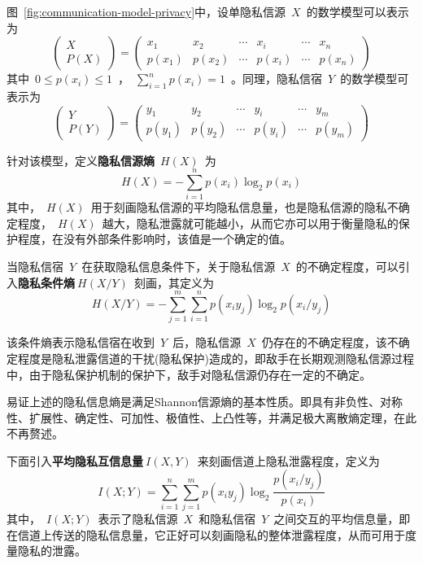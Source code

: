 图~\ref{fig:communication-model-privacy}中，设单隐私信源~$X$~的数学模型可以表示为
\begin{equation}
\begin{pmatrix}
X\\ 
P(X)
\end{pmatrix}=\begin{pmatrix}
x_{1} & x_{2} & \cdots  & x_{i} & \cdots  & x_{n}\\ 
p(x_{1})& p(x_{2}) & \cdots & p(x_{i}) & \cdots & p(x_{n})
\end{pmatrix}
\end{equation}
其中~$0\leqslant p(x_{i})\leqslant1$~，~$\sum_{i=1}^{n}p(x_{i})=1$~。同理，隐私信宿~$Y$~的数学模型可表示为
\begin{equation}
\label{eq:single-information-source}
\begin{pmatrix}
Y\\ 
P(Y)
\end{pmatrix}=\begin{pmatrix}
y_{1} & y_{2} & \cdots  & y_{i} & \cdots  & y_{m}\\ 
p(y_{1})& p(y_{2}) & \cdots & p(y_{i}) & \cdots & p(y_{m})
\end{pmatrix}
\end{equation}

针对该模型，定义\textbf{隐私信源熵}~$H(X)$~为
\begin{equation}
H(X)=-\sum_{i=1}^{n}p(x_{i})\log_{2}p(x_{i})
\end{equation}
其中，~$H(X)$~用于刻画隐私信源的平均隐私信息量，也是隐私信源的隐私不确定程度，~$H(X)$~越大，隐私泄露就可能越小，从而它亦可以用于衡量隐私的保护程度，在没有外部条件影响时，该值是一个确定的值。

当隐私信宿~$Y$~在获取隐私信息条件下，关于隐私信源~$X$~的不确定程度，可以引入\textbf{隐私条件熵}$~H(X/Y)$~刻画，其定义为
\begin{equation}
H(X/Y)=-\sum_{j=1}^{m}\sum_{i=1}^{n}p(x_{i}y_{j})\log_{2}p(x_{i}/y_{j})
\end{equation}

该条件熵表示隐私信宿在收到~$Y$~后，隐私信源~$X$~仍存在的不确定程度，该不确定程度是隐私泄露信道的干扰(隐私保护)造成的，即敌手在长期观测隐私信源过程中，由于隐私保护机制的保护下，敌手对隐私信源仍存在一定的不确定。

易证上述的隐私信息熵是满足Shannon信源熵的基本性质。即具有非负性、对称性、扩展性、确定性、可加性、极值性、上凸性等，并满足极大离散熵定理，在此不再赘述。

下面引入\textbf{平均隐私互信息量}$~I(X,Y)$~来刻画信道上隐私泄露程度，定义为
\begin{equation}
I(X;Y)=\sum_{i=1}^{n}\sum_{j=1}^{m}p(x_{i}y_{j})\log_{2}\frac{p(x_{i}/y_{j})}{p(x_{i})}
\end{equation}
其中，~$I(X;Y)$~表示了隐私信源~$X$~和隐私信宿~$Y$~之间交互的平均信息量，即在信道上传送的隐私信息量，它正好可以刻画隐私的整体泄露程度，从而可用于度量隐私的泄露。

